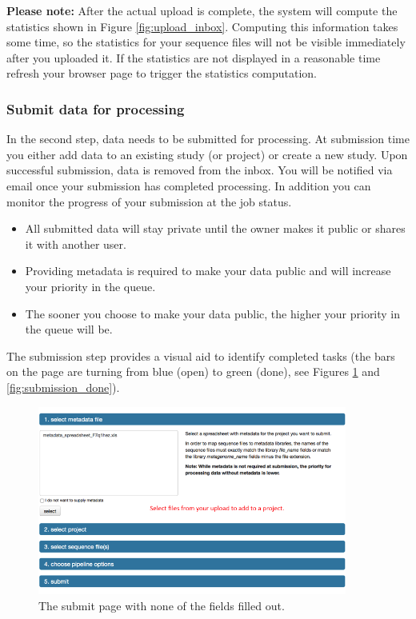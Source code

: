 \documentclass[12pt,fullpage]{report}
\begin{document}
\textbf{Please note:} After the actual upload is complete, the system will compute the statistics shown in Figure \ref{fig:upload_inbox}. Computing this information takes some time, so the statistics for your sequence files will not be visible immediately after you uploaded it. If the statistics are not displayed in a reasonable time refresh your browser page to trigger the statistics computation.


\subsubsection{Submit data for processing}
In the second step, data needs to be submitted for processing. At submission time you either add data to an existing study (or project) or create a new study. Upon successful submission, data is removed from the inbox. You will be notified via email once your submission has completed processing. In addition you can monitor the progress of your submission at the job status.


\begin{itemize}

\item All submitted data will stay private until the owner makes it public or shares it with another user.


\item Providing metadata is required to make your data public and will increase your priority in the queue.

\item The sooner you choose to make your data public, the higher your priority in the queue will be.
\end{itemize}

The submission step provides a visual aid to identify completed tasks (the bars on the page are turning from blue (open) to green (done), see Figures \ref{fig:submission_open} and \ref{fig:submission_done}). 

\begin{figure}
\begin{center} 
\includegraphics[width=4in]{Images/submission_open.png} 
\end{center} \label{fig:submission_open} 
\caption{The submit page with none of the fields filled out.}
\end{figure}
\end{document}
